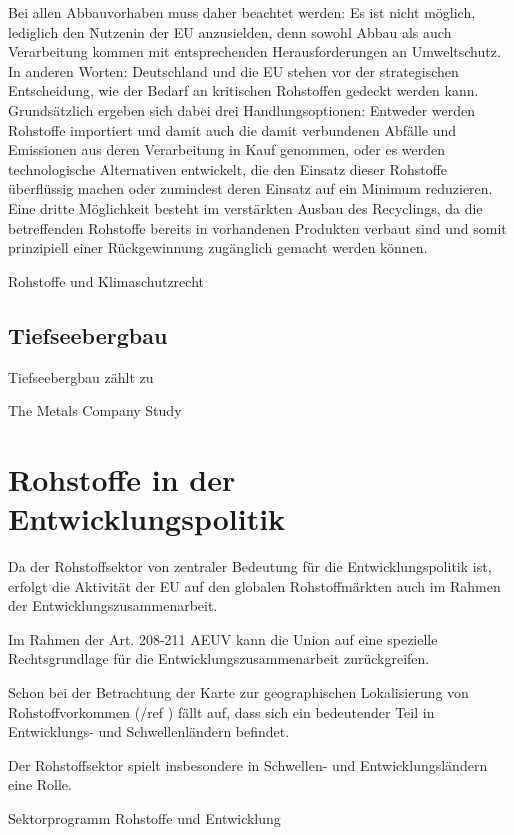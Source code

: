 \documentclass[12pt,a4paper,oneside]{book} %
\begin{document}
Bei allen Abbauvorhaben muss daher beachtet werden: Es ist nicht möglich, lediglich den \glqq Nutzen\grqq in der EU anzusielden, denn sowohl Abbau als auch Verarbeitung kommen mit entsprechenden Herausforderungen an Umweltschutz. In anderen Worten: Deutschland und die EU stehen vor der strategischen Entscheidung, wie der Bedarf an kritischen Rohstoffen gedeckt werden kann. Grundsätzlich ergeben sich dabei drei Handlungsoptionen: Entweder werden Rohstoffe importiert und damit auch die damit verbundenen Abfälle und Emissionen aus deren Verarbeitung in Kauf genommen, oder es werden technologische Alternativen entwickelt, die den Einsatz dieser Rohstoffe überflüssig machen oder zumindest deren Einsatz auf ein Minimum reduzieren. Eine dritte Möglichkeit besteht im verstärkten Ausbau des Recyclings, da die betreffenden Rohstoffe bereits in vorhandenen Produkten verbaut sind und somit prinzipiell einer Rückgewinnung zugänglich gemacht werden können.

Rohstoffe und Klimaschutzrecht

\subsection{Tiefseebergbau}

Tiefseebergbau zählt zu 

The Metals Company Study


\section{Rohstoffe in der Entwicklungspolitik}

Da der Rohstoffsektor von zentraler Bedeutung für die Entwicklungspolitik ist, erfolgt die Aktivität der EU auf den globalen Rohstoffmärkten auch im Rahmen der Entwicklungszusammenarbeit.\autocite{Schorkopf, Rn. 53}



Im Rahmen der Art. 208-211 AEUV kann die Union auf eine spezielle Rechtsgrundlage für die Entwicklungszusammenarbeit zurückgreifen.

Schon bei der Betrachtung der Karte zur geographischen Lokalisierung von Rohstoffvorkommen (/ref ) fällt auf, dass sich ein bedeutender Teil in Entwicklungs- und Schwellenländern befindet.

Der Rohstoffsektor spielt insbesondere in Schwellen- und Entwicklungsländern eine Rolle.

Sektorprogramm Rohstoffe und Entwicklung
\end{document}
